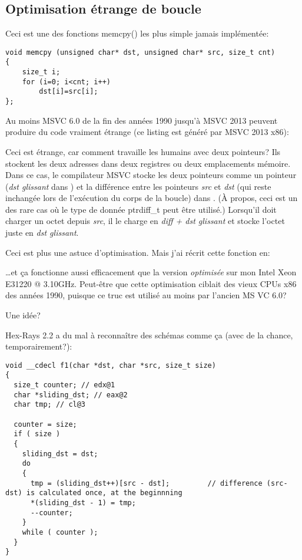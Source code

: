 \subsection{Optimisation étrange de boucle}

Ceci est une des fonctions memcpy() les plus simple jamais implémentée:

\begin{lstlisting}[style=customc]
void memcpy (unsigned char* dst, unsigned char* src, size_t cnt)
{
	size_t i;
	for (i=0; i<cnt; i++)
		dst[i]=src[i];
};
\end{lstlisting}

Au moins MSVC 6.0 de la fin des années 1990 jusqu'à MSVC 2013 peuvent produire du
code vraiment étrange (ce listing est généré par MSVC 2013 x86):



Ceci est étrange, car comment travaille les humains avec deux pointeurs? Ils stockent
les deux adresses dans deux registres ou deux emplacements mémoire.
Dans ce cas, le compilateur MSVC stocke les deux pointeurs comme un pointeur (\emph{dst glissant} dans \EAX)
et la différence entre les pointeurs \emph{src} et \emph{dst} (qui reste inchangée lors
de l'exécution du corps de la boucle) dans \ESI.
(À propos, ceci est un des rare cas où le type de donnée ptrdiff\_t peut être utilisé.)
Lorsqu'il doit charger un octet depuis \emph{src}, il le charge en \emph{diff + dst glissant}
et stocke l'octet juste en \emph{dst glissant}.

Ceci est plus une astuce d'optimisation. Mais j'ai récrit cette fonction en:



\dots et ça fonctionne aussi efficacement que la version \emph{optimisée} sur mon Intel
Xeon E31220 @ 3.10GHz.
Peut-être que cette optimisation ciblait des vieux CPUs x86 des années 1990, puisque
ce truc est utilisé au moins par l'ancien MS VC 6.0?

Une idée?

Hex-Rays 2.2 a du mal à reconnaître des schémas comme ça (avec de la chance, temporairement?):

\begin{lstlisting}[style=customc]
void __cdecl f1(char *dst, char *src, size_t size)
{
  size_t counter; // edx@1
  char *sliding_dst; // eax@2
  char tmp; // cl@3

  counter = size;
  if ( size )
  {
    sliding_dst = dst;
    do
    {
      tmp = (sliding_dst++)[src - dst];         // difference (src-dst) is calculated once, at the beginnning
      *(sliding_dst - 1) = tmp;
      --counter;
    }
    while ( counter );
  }
}
\end{lstlisting}

